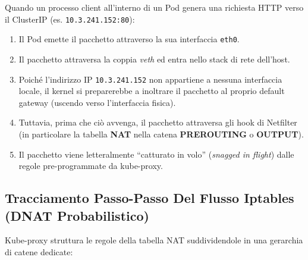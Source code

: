 \documentclass[11pt, a4paper]{article}
\begin{document}
Quando un processo client all'interno di un Pod genera una richiesta HTTP verso il ClusterIP (es. \texttt{10.3.241.152:80}):
\begin{enumerate}[noitemsep]
    \item Il Pod emette il pacchetto attraverso la sua interfaccia \texttt{eth0}.
    \item Il pacchetto attraversa la coppia \emph{veth} ed entra nello stack di rete dell'host.
    \item Poiché l'indirizzo IP \texttt{10.3.241.152} non appartiene a nessuna interfaccia locale, il kernel si preparerebbe a inoltrare il pacchetto al proprio default gateway (uscendo verso l'interfaccia fisica).
    \item Tuttavia, prima che ciò avvenga, il pacchetto attraversa gli hook di Netfilter (in particolare la tabella \textbf{NAT} nella catena \textbf{PREROUTING} o \textbf{OUTPUT}).
    \item Il pacchetto viene letteralmente ``catturato in volo'' (\emph{snagged in flight}) dalle regole pre-programmate da kube-proxy.
\end{enumerate}


\subsection{Tracciamento Passo-Passo Del Flusso Iptables (DNAT Probabilistico)}
Kube-proxy struttura le regole della tabella NAT suddividendole in una gerarchia di catene dedicate:
\end{document}
